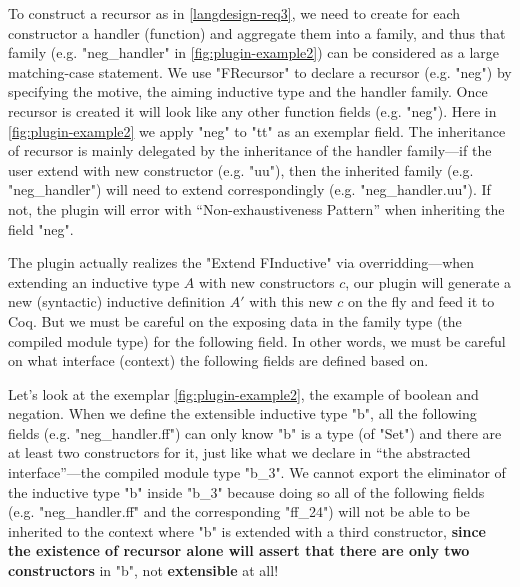To construct a recursor as in \ref{langdesign-req3}, we need to create for each
constructor a handler (function) and aggregate them into a family, and thus that family (e.g. "neg_handler" in \cref{fig:plugin-example2}) can be considered as a large matching-case statement. We use "FRecursor" to declare a recursor (e.g. "neg") by specifying the motive, the aiming inductive type and the handler family. Once recursor is created it will look like any other function fields (e.g. "neg"). Here in \cref{fig:plugin-example2} we apply "neg" to "tt" as an exemplar field. The inheritance of recursor is mainly delegated by the inheritance of the handler family---if the user extend with new constructor (e.g. "uu"), then the inherited family (e.g. "neg_handler") will need to extend correspondingly (e.g. "neg_handler.uu"). If not, the plugin will error with ``Non-exhaustiveness Pattern'' when inheriting the field "neg".

The plugin actually realizes the "Extend FInductive" via overridding---when extending an inductive type $A$
with new constructors $c$, our plugin will generate a new (syntactic) inductive definition $A'$ with this new $c$ on the fly and feed it to Coq. But we must be careful on the exposing data in the family type (the compiled module type) for the following field. In other words, we must be careful on what interface (context) the following fields are defined based on. 

Let's look at the exemplar \cref{fig:plugin-example2}, the example of boolean and negation. When we define the extensible inductive type "b", all the following fields (e.g. "neg_handler.ff") can only know "b" is a type (of "Set") and there are at least two constructors for it, just like what we declare in ``the abstracted interface''---the compiled module type "b_3". We cannot export
the eliminator of the inductive type "b" inside "b_3" because doing so all of the following fields (e.g. "neg_handler.ff" and the corresponding "ff_24") will not be able to be inherited to the context where "b"
is extended with a third constructor, \textbf{since the existence of recursor
alone will assert that there are only two constructors} in "b", not
\textbf{extensible} at all! 

